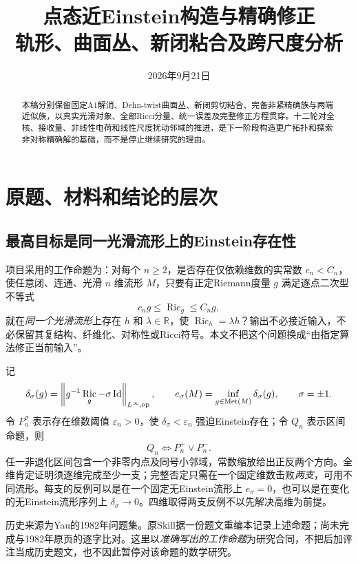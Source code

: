 \documentclass[UTF8,fontset=fandol,zihao=-4]{ctexart}
\title{点态近Einstein构造与精确修正\\[2mm]\large 轨形、曲面丛、新闭粘合及跨尺度分析}
\author{}
\date{2026年9月21日}
\theoremstyle{research}
\DeclareMathOperator{\Ric}{Ric}\DeclareMathOperator{\Rm}{Rm}
\newcommand{\R}{\mathbb R}\newcommand{\Z}{\mathbb Z}\newcommand{\CP}{\mathbb{CP}}
\newcommand{\op}{\mathrm{op}}\newcommand{\dd}{\,d\mu_g}\newcommand{\av}{\fint}
\newcommand{\norm}[1]{\left\|#1\right\|}
\begin{document}
\maketitle
\begin{abstract}
本稿分别保留固定A1解消、Dehn-twist曲面丛、新闭剪切粘合、完备非紧精确族与两端近似族，以真实光滑对象、全部Ricci分量、统一误差及完整修正方程贯穿。十二轮对全核、接收量、非线性电荷和线性尺度扰动邻域的推进，是下一阶段构造更广拓扑和探索非对称精确解的基础，而不是停止继续研究的理由。
\end{abstract}
\tableofcontents
\newpage

\section{原题、材料和结论的层次}\label{sec:common}
\subsection{最高目标是同一光滑流形上的Einstein存在性}
项目采用的工作命题为：对每个 $n\ge2$，是否存在仅依赖维数的实常数 $c_n<C_n$，使任意闭、连通、光滑 $n$ 维流形 $M$，只要有正定Riemann度量 $g$ 满足逐点二次型不等式
\[
 c_ng\le\Ric_g\le C_ng,
\]
就在\emph{同一个光滑流形}上存在 $h$ 和 $\lambda\in\R$，使 $\Ric_h=\lambda h$？输出不必接近输入，不必保留其复结构、纤维化、对称性或Ricci符号。本文不把这个问题换成“由指定算法修正当前输入”。

记
\begin{equation}\label{eq:delta}
 \delta_\sigma(g)=\norm{g^{-1}\Ric_g-\sigma\Id}_{L^\infty,\op},\qquad
 e_\sigma(M)=\inf_{g\in\Met(M)}\delta_\sigma(g),\qquad \sigma=\pm1.
\end{equation}
令 $P_n^\sigma$ 表示存在维数阈值 $\varepsilon_n>0$，使 $\delta_\sigma<\varepsilon_n$ 强迫Einstein存在；令 $Q_n$ 表示区间命题，则
\begin{equation}\label{eq:logic}
 Q_n\iff P_n^+\lor P_n^-.
\end{equation}
任一非退化区间包含一个非零内点及同号小邻域，常数缩放给出正反两个方向。全维肯定证明须逐维完成至少一支；完整否定只需在一个固定维数击败\emph{两支}，可用不同流形。每支的反例可以是在一个固定无Einstein流形上 $e_\sigma=0$，也可以是在变化的无Einstein流形序列上 $\delta_\sigma\to0$。四维取得两支反例不以先解决高维为前提。

历史来源为Yau的1982年问题集\cite{Yau}。原Skill据一份题文重编本记录上述命题；尚未完成与1982年原页的逐字比对。这里以\emph{准确写出的工作命题}为研究合同，不把后加评注当成历史题文，也不因此暂停对该命题的数学研究。
\end{document}
